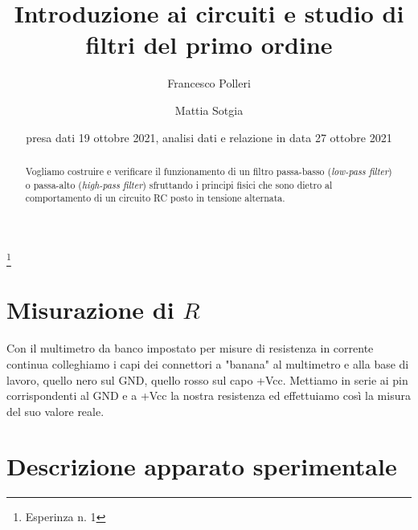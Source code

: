 \documentclass[
    rmp,
    reprint, 
    superscriptaddress, 
    altaffilletter, 
    amsmath, 
    amssymb, 
    a4paper]{revtex4-2}
\begin{document}
\title{
    Introduzione ai circuiti e studio di filtri del primo ordine
}
\thanks{
    Esperinza n. 1
}

\author{Francesco Polleri}
\author{Mattia Sotgia}


\date{presa dati
    19 ottobre 2021, analisi dati e relazione in data 
    27 ottobre 2021
}

\begin{abstract}
    Vogliamo costruire e verificare il funzionamento di un filtro passa-basso (\textit{low-pass filter}) o passa-alto (\textit{high-pass filter}) sfruttando i principi fisici che sono dietro al comportamento di un circuito RC posto in tensione alternata.
        
\end{abstract}
\maketitle
\thispagestyle{fancy}
\section{Misurazione di $R$}
Con il multimetro da banco impostato per misure di resistenza in corrente continua colleghiamo i capi dei connettori a "banana" al multimetro e alla base di lavoro, quello nero sul GND, quello rosso sul capo +Vcc. 
Mettiamo in serie ai pin corrispondenti al GND e a +Vcc la nostra resistenza ed effettuiamo così la misura del suo valore reale. 

\section{Descrizione apparato sperimentale}
\label{section:introduction}
\end{document}
